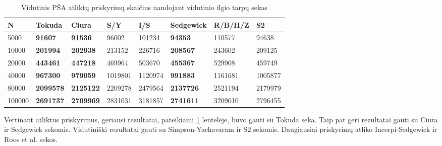 \documentclass{VUMIFInfKursinis}
\begin{document}
\begin{table}[H]
  \caption{Vidutinis PŠA atliktų priskyrimų skaičius naudojant vidutinio ilgio tarpų sekas}
  \label{iss_medium_assignments}
  \begin{tabular}{|l|l|l|l|l|l|l|l|}
  \hline
  N      & Tokuda           & Ciura            & S/Y     & I/S     & Sedgewick        & R/B/H/Z & S2      \\ \hline
  5000   & \textbf{91607}   & \textbf{91536}   & 96002   & 101234  & \textbf{94353}   & 110577  & 94638   \\ \hline
  10000  & \textbf{201994}  & \textbf{202938}  & 213152  & 226716  & \textbf{208567}  & 243602  & 209125  \\ \hline
  20000  & \textbf{443461}  & \textbf{447218}  & 469964  & 503670  & \textbf{455367}  & 529908  & 459749  \\ \hline
  40000  & \textbf{967300}  & \textbf{979059}  & 1019801 & 1120974 & \textbf{991883}  & 1161681 & 1005877 \\ \hline
  80000  & \textbf{2099578} & \textbf{2125122} & 2209278 & 2479564 & \textbf{2137726} & 2521194 & 2179979 \\ \hline
  100000 & \textbf{2691737} & \textbf{2709969} & 2831031 & 3181857 & \textbf{2741611} & 3209010 & 2796455 \\ \hline
  \end{tabular}
\end{table}

Vertinant atliktus priskyrimus, geriausi rezultatai, pateikiami \ref{iss_medium_assignments} lentelėje, buvo gauti su Tokuda seka.
Taip pat geri rezultatai gauti su Ciura ir Sedgewick sekomis.
Vidutiniški rezultatai gauti su Simpson-Yachavaram ir S2 sekomis.
Daugiausiai priskyrimų atliko Incerpi-Sedgewick ir Roos et al. sekos.
\end{document}
